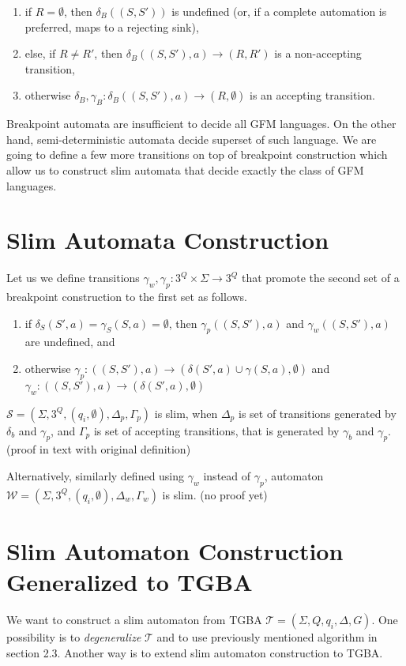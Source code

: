 \documentclass[
	digital
nolof, nolot
]{fithesis3}
\newcommand{\cS}{\mathcal{S}}
\newcommand{\cT}{\mathcal{T}}
\begin{document}
			\begin{enumerate}
				\item if $R=\emptyset$, then $\delta_B((S,S'))$ is undefined (or, if a complete automation is preferred, maps to a rejecting sink),
				\item else, if $R \neq R'$, then $\delta_B((S,S'),a)\rightarrow(R, R')$ is a non-accepting transition,
				\item otherwise $\delta_B, \gamma_B: \delta_B((S,S'),a)\rightarrow(R, \emptyset)$ is an accepting transition.
			\end{enumerate}
			
			Breakpoint automata are insufficient to decide all GFM languages. On the other hand, semi-deterministic automata decide superset of such language. We are going to define a few more transitions on top of breakpoint construction which allow us to construct slim automata that decide exactly the class of GFM languages.
			
			\section{Slim Automata Construction}
			Let us we define transitions  $\gamma_w, \gamma_p:3^Q \times \Sigma \rightarrow 3^Q$ that promote the second set of a breakpoint construction to the first set as follows. 
			
			\begin{enumerate}
				\item if $\delta_S(S',a) = \gamma_S(S, a) = \emptyset$, then $\gamma_{p}((S,S'), a)$ and $\gamma_{w}((S,S'), a)$ are undefined, and
				\item otherwise
				$\gamma_{p}:((S,S'),a)\rightarrow(\delta(S',a)\cup\gamma(S, a),\emptyset)$ and $\gamma_{w}:((S,S'),a)\rightarrow(\delta(S',a),\emptyset)$
			\end{enumerate}
			
			
			$\cS=(\Sigma, 3^Q, (q_i,\emptyset), \Delta_p ,\Gamma_p)$ is slim, when
			$\Delta_p$ is set of transitions generated by $\delta_b$ and $\gamma_p$, and $\Gamma_p$ is set of accepting transitions, that is generated by $\gamma_b$ and $\gamma_p$. (proof in text with original definition)
			
			Alternatively, similarly defined using $\gamma_w$ instead of $\gamma_{p}$, automaton $\mathcal{W}=(\Sigma, 3^Q, (q_i,\emptyset), \Delta_w, \Gamma_w)$ is slim. (no proof yet)

			
			\section{Slim Automaton Construction Generalized to TGBA}
			We want to construct a slim automaton from TGBA $\cT=(\Sigma, Q, q_i, \Delta, G)$. One possibility is to \emph{degeneralize} $\cT$ and to use previously mentioned algorithm in section 2.3. Another way is to extend slim automaton construction to TGBA.
\end{document}
